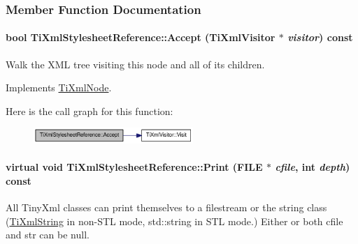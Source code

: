 \subsubsection{Member Function Documentation}
\hypertarget{class_ti_xml_stylesheet_reference_a540b55b318f90fce1254aa3ecba0331a}{
\paragraph[{Accept}]{\setlength{\rightskip}{0pt plus 5cm}bool TiXmlStylesheetReference::Accept ({\bf TiXmlVisitor} $\ast$ {\em visitor}) const}\hfill}
\label{class_ti_xml_stylesheet_reference_a540b55b318f90fce1254aa3ecba0331a}
Walk the XML tree visiting this node and all of its children. 

Implements \hyperlink{class_ti_xml_node_acc0f88b7462c6cb73809d410a4f5bb86}{TiXmlNode}.

Here is the call graph for this function:\nopagebreak
\begin{figure}[H]
\begin{center}
\leavevmode
\includegraphics[width=171pt]{class_ti_xml_stylesheet_reference_a540b55b318f90fce1254aa3ecba0331a_cgraph}
\end{center}
\end{figure}
\hypertarget{class_ti_xml_stylesheet_reference_a49db8b6b92877c4afec7d20c307b9c6b}{
\paragraph[{Print}]{\setlength{\rightskip}{0pt plus 5cm}virtual void TiXmlStylesheetReference::Print (FILE $\ast$ {\em cfile}, \/  int {\em depth}) const}\hfill}
\label{class_ti_xml_stylesheet_reference_a49db8b6b92877c4afec7d20c307b9c6b}
All TinyXml classes can print themselves to a filestream or the string class (\hyperlink{class_ti_xml_string}{TiXmlString} in non-\/STL mode, std::string in STL mode.) Either or both cfile and str can be null.

